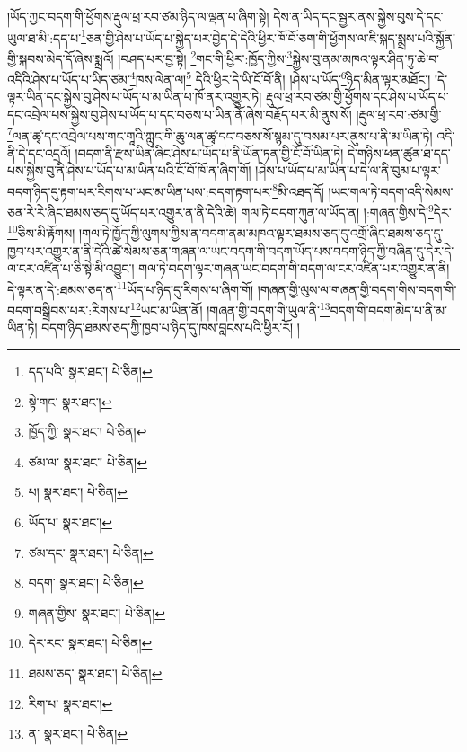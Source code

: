 །ཡོད་ཀྱང་བདག་གི་ཕྱོགས་རྡུལ་ཕྲ་རབ་ཙམ་ཉིད་ལ་ལྡན་པ་ཞིག་སྟེ། དེས་ན་ཡིད་དང་སྦྱར་ནས་སྐྱེས་བུས་དེ་དང་ཡུལ་ཐ་མི་:དད་པ་\footnote{དད་པའི་  སྣར་ཐང་།  པེ་ཅིན། }ཅན་གྱི་ཤེས་པ་ཡོད་པ་སྐྱེད་པར་བྱེད་དེ་དེའི་ཕྱིར་ཁོ་བོ་ཅག་གི་ཕྱོགས་ལ་ཇི་སྐད་སྨྲས་པའི་སྐྱོན་གྱི་སྐབས་མེད་དོ་ཞེས་སྨྲའོ། །བཤད་པར་བྱ་སྟེ། \footnote{སྟེ་གང་  སྣར་ཐང་། }གང་གི་ཕྱིར་:ཁྱོད་ཀྱིས་\footnote{ཁྱོད་ཀྱི་  སྣར་ཐང་།  པེ་ཅིན། }སྐྱེས་བུ་ནམ་མཁའ་ལྟར་ཤིན་ཏུ་ཆེ་བ་འདིའི་ཤེས་པ་ཡོད་པ་ཡིད་ཙམ་\footnote{ཙམ་ལ་  སྣར་ཐང་།  པེ་ཅིན། }ཁས་ལེན་ལ།\footnote{པ།  སྣར་ཐང་།  པེ་ཅིན། } དེའི་ཕྱིར་དེ་ཡི་ངོ་བོ་ནི། །ཤེས་པ་ཡོད་\footnote{ཡོད་པ་  སྣར་ཐང་། }ཉིད་མིན་ལྟར་མཐོང་། །དེ་ལྟར་ཡིན་དང་སྐྱེས་བུ་ཤེས་པ་ཡོད་པ་མ་ཡིན་པ་ཁོ་ནར་འགྱུར་ཏེ། རྡུལ་ཕྲ་རབ་ཙམ་གྱི་ཕྱོགས་དང་ཤེས་པ་ཡོད་པ་དང་འབྲེལ་པས་སྐྱེས་བུ་ཤེས་པ་ཡོད་པ་དང་བཅས་པ་ཡིན་ནོ་ཞེས་བརྗོད་པར་མི་ནུས་སོ། །རྡུལ་ཕྲ་རབ་:ཙམ་གྱི་\footnote{ཙམ་དང་  སྣར་ཐང་།  པེ་ཅིན། }ལན་ཚྭ་དང་འབྲེལ་པས་གང་གཱའི་ཀླུང་གི་ཆུ་ལན་ཚྭ་དང་བཅས་སོ་སྙམ་དུ་བསམ་པར་ནུས་པ་ནི་མ་ཡིན་ཏེ། འདི་ནི་དེ་དང་འདྲའོ། །བདག་ནི་རྫས་ཡིན་ཞིང་ཤེས་པ་ཡོད་པ་ནི་ཡོན་ཏན་གྱི་ངོ་བོ་ཡིན་ཏེ། དེ་གཉིས་ཕན་ཚུན་ཐ་དད་པས་སྐྱེས་བུ་ནི་ཤེས་པ་ཡོད་པ་མ་ཡིན་པའི་ངོ་བོ་ཁོ་ན་ཞིག་གོ། །ཤེས་པ་ཡོད་པ་མ་ཡིན་པ་དེ་ལ་ནི་བུམ་པ་ལྟར་བདག་ཉིད་དུ་རྟག་པར་རིགས་པ་ཡང་མ་ཡིན་པས་:བདག་རྟག་པར་\footnote{བདག་  སྣར་ཐང་།  པེ་ཅིན། }མི་འཐད་དོ། །ཡང་གལ་ཏེ་བདག་འདི་སེམས་ཅན་རེ་རེ་ཞིང་ཐམས་ཅད་དུ་ཡོད་པར་འགྱུར་ན་ནི་དེའི་ཚེ། གལ་ཏེ་བདག་ཀུན་ལ་ཡོད་ན། །:གཞན་གྱིས་དེ་\footnote{གཞན་གྱིས་  སྣར་ཐང་།  པེ་ཅིན། }དེར་\footnote{དེར་རང་  སྣར་ཐང་།  པེ་ཅིན། }ཅིས་མི་རྟོགས། །གལ་ཏེ་ཁྱོད་ཀྱི་ལུགས་ཀྱིས་ན་བདག་ནམ་མཁའ་ལྟར་ཐམས་ཅད་དུ་འགྲོ་ཞིང་ཐམས་ཅད་དུ་ཁྱབ་པར་འགྱུར་ན་ནི་དེའི་ཚེ་སེམས་ཅན་གཞན་ལ་ཡང་བདག་གི་བདག་ཡོད་པས་བདག་ཉིད་ཀྱི་བཞིན་དུ་དེར་དེ་ལ་ངར་འཛིན་པ་ཅི་སྟེ་མི་འབྱུང་། གལ་ཏེ་བདག་ལྟར་གཞན་ཡང་བདག་གི་བདག་ལ་ངར་འཛིན་པར་འགྱུར་ན་ནི། དེ་ལྟར་ན་དེ་:ཐམས་ཅད་ན་\footnote{ཐམས་ཅད་  སྣར་ཐང་།  པེ་ཅིན། }ཡོད་པ་ཉིད་དུ་རིགས་པ་ཞིག་གོ། །གཞན་གྱི་ལུས་ལ་གཞན་གྱི་བདག་གིས་བདག་གི་བདག་བསྒྲིབས་པར་:རིགས་པ་\footnote{རིག་པ་  སྣར་ཐང་། }ཡང་མ་ཡིན་ནོ། །གཞན་གྱི་བདག་གི་ཡུལ་ནི་\footnote{ན་  སྣར་ཐང་།  པེ་ཅིན། }བདག་གི་བདག་མེད་པ་ནི་མ་ཡིན་ཏེ། བདག་ཉིད་ཐམས་ཅད་ཀྱི་ཁྱབ་པ་ཉིད་དུ་ཁས་བླངས་པའི་ཕྱིར་རོ། །
